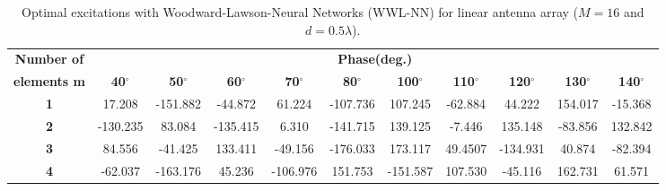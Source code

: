 \documentclass[conference]{IEEEtran}
\begin{document}
\begin{table*}[!ht]
\caption{Optimal excitations with Woodward-Lawson-Neural Networks (WWL-NN) for linear antenna array ($M=16$ and  $d = 0.5\lambda$).}
\begin{center}
\renewcommand{\arraystretch}{1}
\small{
\begin{tabular}{|l|l|l|l|l|l|l|l|l|l|l|}
\cline{2-11}
\hline
\multicolumn{1}{|c|}{\textbf{Number of} } & \multicolumn{10}{c|}{\textbf{Phase(deg.)}} \\ 
\cline{2-11}
\multicolumn{1}{|c|}{\textbf{elements m}} & \multicolumn{1}{c|}{\textbf{40$^\circ$}} & \multicolumn{1}{c|}{\textbf{50$^\circ$}} & \multicolumn{1}{c|}{\textbf{60$^\circ$}} & \multicolumn{1}{c|}{\textbf{70$^\circ$}} & \multicolumn{1}{c|}{\textbf{80$^\circ$}} & \multicolumn{1}{c|}{\textbf{100$^\circ$}} & \multicolumn{1}{c|}{\textbf{110$^\circ$}} & \multicolumn{1}{c|}{\textbf{120$^\circ$}} & \multicolumn{1}{c|}{\textbf{130$^\circ$}} & \multicolumn{1}{c|}{\textbf{140$^\circ$}} \\ 
\hline
\multicolumn{1}{|c|}{\textbf{1}} & \multicolumn{1}{c|}{17.208} & \multicolumn{1}{c|}{-151.882} & \multicolumn{1}{c|}{-44.872} & \multicolumn{1}{c|}{61.224} & \multicolumn{1}{c|}{-107.736} & \multicolumn{1}{c|}{107.245} & \multicolumn{1}{c|}{-62.884} & \multicolumn{1}{c|}{44.222} & \multicolumn{1}{c|}{154.017} & \multicolumn{1}{c|}{-15.368} \\ 
\hline
\multicolumn{1}{|c|}{\textbf{2}} & \multicolumn{1}{c|}{-130.235} & \multicolumn{1}{c|}{83.084} & \multicolumn{1}{c|}{-135.415} & \multicolumn{1}{c|}{6.310} & \multicolumn{1}{c|}{-141.715} & \multicolumn{1}{c|}{139.125} & \multicolumn{1}{c|}{-7.446} & \multicolumn{1}{c|}{135.148} & \multicolumn{1}{c|}{-83.856} & \multicolumn{1}{c|}{132.842} \\ 
\hline
\multicolumn{1}{|c|}{\textbf{3}} & \multicolumn{1}{c|}{84.556} & \multicolumn{1}{c|}{-41.425} & \multicolumn{1}{c|}{133.411} & \multicolumn{1}{c|}{-49.156} & \multicolumn{1}{c|}{-176.033} & \multicolumn{1}{c|}{173.117} & \multicolumn{1}{c|}{49.4507} & \multicolumn{1}{c|}{-134.931} & \multicolumn{1}{c|}{40.874} & \multicolumn{1}{c|}{-82.394} \\ 
\hline
\multicolumn{1}{|c|}{\textbf{4}} & \multicolumn{1}{c|}{-62.037} & \multicolumn{1}{c|}{-163.176} & \multicolumn{1}{c|}{45.236} & \multicolumn{1}{c|}{-106.976} & \multicolumn{1}{c|}{151.753} & \multicolumn{1}{c|}{-151.587} & \multicolumn{1}{c|}{107.530} & \multicolumn{1}{c|}{-45.116} & \multicolumn{1}{c|}{162.731} & \multicolumn{1}{c|}{61.571} \\ 

\end{tabular}}
\end{center}
\end{table*}
\end{document}
